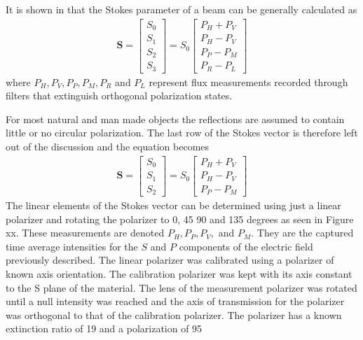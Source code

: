 It is shown in \cite{chipman} that the Stokes parameter of a beam can be generally calculated as
%
\begin{align}
    \mathbf{S} =
    \begin{bmatrix}
        S_0 \\
        S_1 \\
        S_2 \\
        S_3
    \end{bmatrix}
    =
    S_0
    \begin{bmatrix}
        P_H + P_V \\
        P_H - P_V \\
        P_P - P_M \\
        P_R - P_L
    \end{bmatrix}
\end{align}
%
where $P_H, P_V, P_P, P_M, P_R$ and $P_L$ represent flux measurements recorded through filters that extinguish orthogonal polarization states.

For most natural and man made objects the reflections are assumed to contain little or no circular polarization. The last row of the Stokes vector is therefore left out of the discussion and the equation becomes
%
\begin{align}
    \mathbf{S} =
    \begin{bmatrix}
        S_0 \\
        S_1 \\
        S_2
    \end{bmatrix}
    =
    S_0
    \begin{bmatrix}
        P_H + P_V \\
        P_H - P_V \\
        P_P - P_M
    \end{bmatrix}
\end{align}
%
The linear elements of the Stokes vector can be determined using just a linear polarizer and rotating the polarizer to 0, 45 90 and 135 degrees as seen in Figure xx.  These measurements are denoted $P_H, P_P, P_V,$ and $P_M$. They are the captured time average intensities for the $S$ and $P$ components of the electric field previously described.
%
%
The linear polarizer was calibrated using a polarizer of known axis orientation.  The calibration polarizer was kept with its axis constant to the S plane of the material.  The lens of the measurement polarizer was rotated until a null intensity was reached and the axis of transmission for the polarizer was orthogonal to that of the calibration polarizer.  The polarizer has a known extinction ratio of 19 and a polarization of 95%

